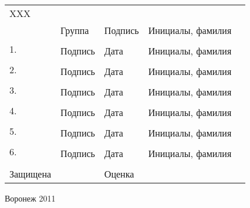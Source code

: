 \begin{tabular}{p{14em}p{6em}@{}p{6em}@{}r@{}r}
XXX & \hrulefill{}  & \hrulefill{}  & \hrulefill{}  \\
 &  \small{Группа}  & \small{Подпись} &\small{Инициалы, фамилия} \\

\multirow{2}{12em}{1. \newline{}} & \hrulefill{} & \hrulefill{} & \hrulefill{}  \\
 & \small{Подпись}  & \small{Дата} & \small{Инициалы, фамилия} \\

\multirow{2}{12em}{2. \newline{}} & \hrulefill{} & \hrulefill{} & \hrulefill{}  \\
 & \small{Подпись}  & \small{Дата} & \small{Инициалы, фамилия} \\

\multirow{2}{12em}{3. \newline{}} & \hrulefill{} & \hrulefill{} & \hrulefill{}  \\
 & \small{Подпись}  & \small{Дата} & \small{Инициалы, фамилия} \\

\multirow{2}{12em}{4. \newline{}} & \hrulefill{} & \hrulefill{} & \hrulefill{}  \\
 & \small{Подпись}  & \small{Дата} & \small{Инициалы, фамилия} \\

\multirow{2}{12em}{5. \newline{}} & \hrulefill{} & \hrulefill{} & \hrulefill{}  \\
 & \small{Подпись}  & \small{Дата} & \small{Инициалы, фамилия} \\

\multirow{2}{12em}{6. \newline{}} & \hrulefill{} & \hrulefill{} & \hrulefill{}  \\
 & \small{Подпись}  & \small{Дата} & \small{Инициалы, фамилия} \\

& & & \\
Защищена \hrulefill{} &  & Оценка \hrulefill{} & \hrulefill{} 
\end{tabular}

\vspace{3em}

\begin{center}Воронеж 2011\end{center}
